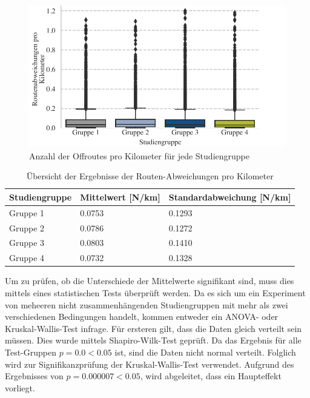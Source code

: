 \begin{figure}
    \centering
    \includegraphics[width=\textwidth]{contents/06_model_evaluation/02_evaluation/res/off_route_result_overview.pdf}
    \caption{Anzahl der Offroutes pro Kilometer für jede Studiengruppe}
\end{figure}

\begin{table}
    \centering
    \begin{tabular}{p{}p{}p{}}
        \hline
        Studiengruppe  & Mittelwert [N/km] & Standardabweichung [N/km]\\
        \toprule
        Gruppe 1                & 0.0753 & 0.1293 \\
        Gruppe 2                & 0.0786 & 0.1272 \\
        Gruppe 3                & 0.0803 & 0.1410 \\
        Gruppe 4                & 0.0732 &  0.1328 \\
        \bottomrule
    \end{tabular}
    \caption{Übersicht der Ergebnisse der Routen-Abweichungen pro Kilometer}
    \label{tab:study_offroute_results}
\end{table}

Um zu prüfen, ob die Unterschiede der Mittelwerte signifikant sind, muss dies mittels eines statistischen Tests überprüft werden. Da es sich um ein Experiment von meheeren nicht zusammenhängenden Studiengruppen mit mehr als zwei verschiedenen Bedingungen handelt, kommen entweder ein ANOVA- oder Kruskal-Wallis-Test infrage. Für ersteren gilt, dass die Daten gleich verteilt sein müssen. Dies wurde mittels Shapiro-Wilk-Test geprüft. Da das Ergebnis für alle Test-Gruppen $ p = 0.0 < 0.05 $ ist, sind die Daten nicht normal verteilt. Folglich wird zur Signifikanzprüfung der Kruskal-Wallis-Test verwendet. Aufgrund des Ergebnisses von $ p = 0.000007 < 0.05 $, wird abgeleitet, dass ein Haupteffekt vorliegt.

